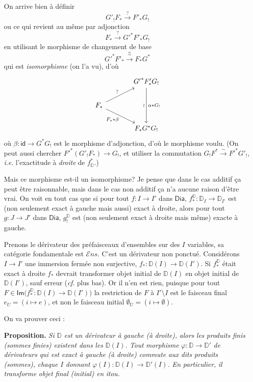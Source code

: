 \documentclass[11pt]{article}
\newcommand{\printedpage}[1]{\marginpar{\footnotesize p.~#1}}
\newcommand{\msp}[1]{\marginpar{\footnotesize [#1]}}
\newcommand{\D}{\mathbb{D}}
\newcommand{\Dia}{\mathsf{Dia}}
\newcommand{\id}{\mathsf{id}}
\newcommand{\Ens}{\mathcal{E}ns}
\newcommand{\sIm}{\mathsf{Im}}
\begin{document}
\printedpage{17}

On arrive bien à définir
\[
G'_!F_* \xrightarrow{?} F'_*G_!
\]
ou ce qui revient au même par adjonction
\[
F_* \xrightarrow{?} {G'}^*F'_*G_!
\]
en utilisant le morphisme de changement de base
\[
{G'}^*F'_* \xrightarrow{\overset{\alpha}{\sim}} F_*G^*
\]
qui est \textit{isomorphisme} (on l'a vu), d'où
\[
\begin{tikzcd}[column sep=large, row sep=normal]
& {G'}^*F'_*G_! \arrow[dd, "\wr"', "\alpha * G_!"] \\
F_* \arrow[ur, "?"] \arrow[dr, "F_* * \beta"'] & \\
& F_*G^*G_!
\end{tikzcd}
\]
où $\beta : \id \to G^*G_!$ est le morphisme d'adjonction, d'où le morphisme voulu. (On peut aussi chercher ${F'}^*(G'_!F_*) \to G_!$, et utiliser la commutation $G_!F^* \overset{\sim}{\to} {F'}^*G'_!$, \textit{i.e.} l'exactitude à \textit{droite} de $f^*_{\D}$.)

\msp{page 25}

Mais ce morphisme est-il un isomorphisme? Je pense que dans le cas additif ça peut être raisonnable, mais dans le cas non additif ça n'a aucune raison d'être vrai. On voit en tout cas que si pour tout $f : I \to I'$ dans $\Dia$, $f^{\D}_* : \D_I \to \D_{I'}$ est (non seulement exact à gauche mais aussi) exact à droite, alors pour tout $g : J \to J'$ dans $\Dia$, $g^{\D}_!$ est (non seulement exact à droite mais même) exacte à gauche. %

Prenons le dérivateur des préfaisceaux d'ensembles sur des $I$ variables, sa catégorie fondamentale est $\Ens$. C'est un dérivateur non ponctué. Considérons $I \to I'$ une immersion fermée non surjective, $f_* : \D(I) \to \D(I')$. Si $f^{\D}_*$ était exact à droite $f_*$ devrait transformer objet initial de $\D(I)$ en objet initial de $\D(I')$, sauf erreur (\textit{cf.} plus bas). Or il n'en est rien, puisque pour tout $F \in \sIm\bigl(f^{\D}_* : \D(I) \to \D(I')\bigr)$ la restriction de $F$ à $I' \setminus I$ est le faisceau final $e_U = (i \mapsto e)$, et non le faisceau initial $\emptyset_U = (i \mapsto \emptyset)$.

On va prouver ceci :

\textbf{Proposition.} \textit{Si $\D$ est un dérivateur à gauche (à droite), alors les produits finis (sommes finies) existent dans les $\D(I)$. Tout morphisme $\varphi : \D \to \D'$ de dérivateurs qui est exact à gauche (à droite) commute aux dits produits (sommes), chaque $I$ donnant $\varphi(I) : \D(I) \to \D'(I)$. En particulier, il transforme objet final (initial) en itou.}
\end{document}
